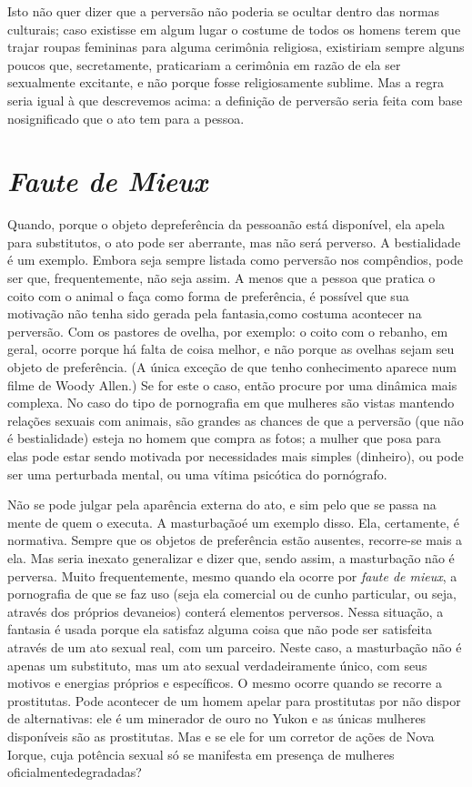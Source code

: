 Isto não quer dizer que a perversão não poderia se ocultar dentro
das normas culturais; caso existisse em algum lugar o costume de todos
os homens terem que trajar roupas femininas para alguma cerimônia
religiosa, existiriam sempre alguns poucos que, secretamente,
praticariam a cerimônia em razão de ela ser sexualmente excitante, e
não porque fosse religiosamente sublime. Mas a regra seria igual à que
descrevemos acima: a definição de perversão seria feita com base no\idxvariacult[|)]
significado que o ato tem para a pessoa.


\section{\textsl{Faute de Mieux}}

Quando, porque o objeto de\idxfaute[|(] preferência da pessoa\idxvariafaut[|(] não está
disponível, ela apela para substitutos, o ato pode ser aberrante, mas
não será perverso. A\idxpornobest{} bestialidade\idxbesta{} é um exemplo. Embora seja sempre
listada como perversão nos compêndios, pode ser que, frequentemente,
não seja assim. A menos que a pessoa que pratica o coito com o animal o
faça como forma de preferência, é possível que sua motivação não tenha
sido gerada pela fantasia,\idxfanta[|(] como costuma acontecer na perversão. Com os
pastores de ovelha, por exemplo: o coito com o rebanho, em geral,
ocorre porque há falta de coisa melhor, e não porque as ovelhas sejam
seu objeto de preferência. (A única exceção de que tenho conhecimento
aparece num filme de Woody Allen.) Se for este o caso, então procure
por uma dinâmica mais complexa. No caso do tipo de pornografia em que
mulheres são vistas mantendo relações sexuais com animais, são grandes
as chances de que a perversão (que não é bestialidade) esteja no homem
que compra as fotos; a mulher que posa para elas pode estar sendo
motivada por necessidades mais simples (dinheiro), ou pode ser uma
perturbada mental, ou uma vítima psicótica do pornógrafo.

Não se pode julgar pela aparência externa do ato, e sim pelo que se
passa na mente de quem o executa. A masturbação\idxmastur[|(] é um exemplo disso.
Ela, certamente, é normativa. Sempre que os objetos de preferência
estão ausentes, recorre-se mais a ela. Mas seria inexato generalizar e
dizer que, sendo assim, a masturbação\idxpornomast{} não é perversa. Muito
frequentemente, mesmo quando ela ocorre por \textit{faute de mieux}, a
pornografia de que se faz uso (seja ela comercial ou de cunho
particular, ou seja, através dos próprios devaneios) conterá elementos
perversos. Nessa situação, a fantasia é usada porque ela satisfaz
alguma coisa que não pode ser satisfeita através de um ato sexual real,
com um parceiro. Neste caso, a masturbação não é apenas um substituto,
mas um ato sexual verdadeiramente único, com seus motivos e energias
próprios e específicos. O mesmo ocorre quando se recorre a prostitutas.
Pode acontecer de um homem apelar para prostitutas por não dispor de
alternativas: ele é um minerador de ouro no Yukon e as únicas
mulheres disponíveis são as prostitutas. Mas e se ele for um corretor
de ações de Nova Iorque, cuja potência sexual só se manifesta em
presença de mulheres oficialmente\idxmastur[|)] degradadas?

